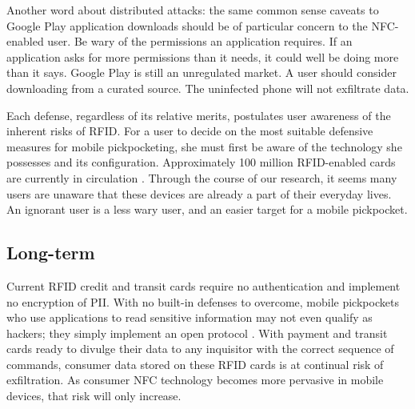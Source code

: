 \documentclass{sig-alternate}
\begin{document}
Another word about distributed attacks: the same common sense caveats to Google Play application downloads should be of particular concern to the NFC-enabled user.  Be wary of the permissions an application requires.  If an application asks for more permissions than it needs, it could well be doing more than it says.  Google Play is still an unregulated market.  A user should consider downloading from a curated source.  The uninfected phone will not exfiltrate data.  

Each defense, regardless of its relative merits, postulates user awareness of the inherent risks of RFID.  For a user to decide on the most suitable defensive measures for mobile pickpocketing, she must first be aware of the technology she possesses and its configuration.  Approximately 100 million RFID-enabled cards are currently in circulation \cite{forbes-1}.  Through the course of our research, it seems many users are unaware that these devices are already a part of their everyday lives.  An ignorant user is a less wary user, and an easier target for a mobile pickpocket.

\subsection{Long-term}
Current RFID credit and transit cards require no authentication and implement no encryption of PII.  With no built-in defenses to overcome, mobile pickpockets who use applications to read sensitive information may not even qualify as hackers; they simply implement an open protocol \cite{bt-hacking-nfc-ccs}.  With payment and transit cards ready to divulge their data to any inquisitor with the correct sequence of commands, consumer data stored on these RFID cards is at continual risk of exfiltration.  As consumer NFC technology becomes more pervasive in mobile devices, that risk will only increase.
\end{document}
